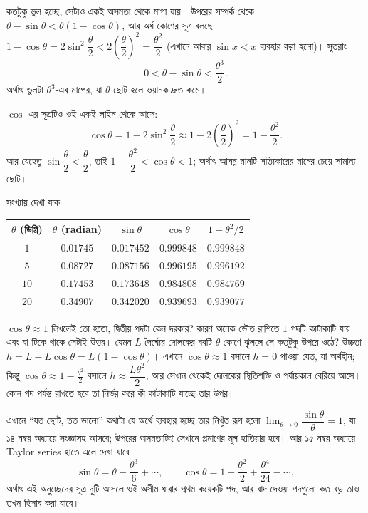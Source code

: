 \documentclass[11pt]{article}
\begin{document}
কতটুকু ভুল হচ্ছে, সেটাও একই অসমতা থেকে মাপা যায়। উপরের সম্পর্ক থেকে
$\theta - \sin\theta < \theta(1-\cos\theta)$, আর অর্ধ কোণের সূত্র বলছে
$1 - \cos\theta = 2\sin^{2}\dfrac{\theta}{2} < 2\left( \dfrac{\theta}{2}
\right)^{2} = \dfrac{\theta^{2}}{2}$ (এখানে আবার $\sin x < x$ ব্যবহার করা হলো)।
সুতরাং
\[
  0 < \theta - \sin\theta < \frac{\theta^{3}}{2} .
\]
অর্থাৎ ভুলটা $\theta^{3}$-এর মাপের, যা $\theta$ ছোট হলে ভয়ানক দ্রুত কমে।

$\cos$-এর সূত্রটিও ওই একই লাইন থেকে আসে:
\[
  \cos\theta = 1 - 2\sin^{2}\frac{\theta}{2}
  \approx 1 - 2\left( \frac{\theta}{2} \right)^{2}
  = 1 - \frac{\theta^{2}}{2} .
\]
আর যেহেতু $\sin\dfrac{\theta}{2} < \dfrac{\theta}{2}$, তাই
$1 - \dfrac{\theta^{2}}{2} < \cos\theta < 1$; অর্থাৎ আসন্ন মানটি সত্যিকারের
মানের চেয়ে সামান্য ছোট।

সংখ্যায় দেখা যাক।

\begin{center}
\begin{tabular}{c|c|c|c|c}
 $\theta$ (ডিগ্রি) & $\theta$ (radian) & $\sin\theta$ & $\cos\theta$
 & $1-\theta^{2}/2$ \\ \hline
 $1$  & $0.01745$ & $0.017452$ & $0.999848$ & $0.999848$ \\
 $5$  & $0.08727$ & $0.087156$ & $0.996195$ & $0.996192$ \\
 $10$ & $0.17453$ & $0.173648$ & $0.984808$ & $0.984769$ \\
 $20$ & $0.34907$ & $0.342020$ & $0.939693$ & $0.939077$ \\
\end{tabular}
\end{center}

\begin{remark}
$\cos\theta \approx 1$ লিখলেই তো হতো, দ্বিতীয় পদটা কেন দরকার? কারণ অনেক ভৌত
রাশিতে $1$ পদটি কাটাকাটি যায় এবং যা টিকে থাকে সেটাই উত্তর। যেমন $L$ দৈর্ঘ্যের
দোলকের ববটি $\theta$ কোণে ঝুললে সে কতটুকু উপরে ওঠে? উচ্চতা
$h = L - L\cos\theta = L(1-\cos\theta)$। এখানে $\cos\theta \approx 1$ বসালে
$h = 0$ পাওয়া যেত, যা অর্থহীন; কিন্তু $\cos\theta \approx 1 -
\tfrac{\theta^{2}}{2}$ বসালে $h \approx \dfrac{L\theta^{2}}{2}$, আর সেখান থেকেই
দোলকের স্থিতিশক্তি ও পর্যায়কাল বেরিয়ে আসে। কোন পদ পর্যন্ত রাখতে হবে তা নির্ভর
করে কী কাটাকাটি যাচ্ছে তার উপর।
\end{remark}

\begin{remark}
এখানে ``যত ছোট, তত ভালো'' কথাটা যে অর্থে ব্যবহার হচ্ছে তার নিখুঁত রূপ হলো
$\lim_{\theta \to 0} \dfrac{\sin\theta}{\theta} = 1$, যা ১৪ নম্বর অধ্যায়ে
সংজ্ঞাসহ আসবে; উপরের অসমতাটিই সেখানে প্রমাণের মূল হাতিয়ার হবে। আর ১৫ নম্বর
অধ্যায়ে Taylor series হাতে এলে দেখা যাবে
\[
  \sin\theta = \theta - \frac{\theta^{3}}{6} + \cdots, \qquad
  \cos\theta = 1 - \frac{\theta^{2}}{2} + \frac{\theta^{4}}{24} - \cdots ,
\]
অর্থাৎ এই অনুচ্ছেদের সূত্র দুটি আসলে ওই অসীম ধারার প্রথম কয়েকটি পদ, আর
বাদ দেওয়া পদগুলো কত বড় তাও তখন হিসাব করা যাবে।
\end{remark}
\end{document}
